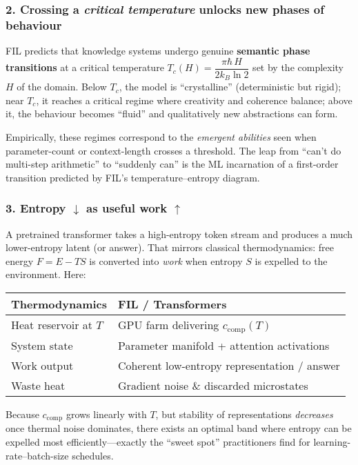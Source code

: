 \documentclass[11pt,letterpaper]{article}
\begin{document}
\subsubsection*{2. Crossing a \emph{critical temperature} unlocks new phases of behaviour}
FIL predicts that knowledge systems undergo genuine \textbf{semantic phase transitions} at a critical temperature $T_{c}(H) = \dfrac{\pi\hbar\,H}{2k_{B}\ln 2}$ set by the complexity $H$ of the domain. Below $T_{c}$, the model is “crystalline” (deterministic but rigid); near $T_{c}$, it reaches a critical regime where creativity and coherence balance; above it, the behaviour becomes “fluid” and qualitatively new abstractions can form.

Empirically, these regimes correspond to the \emph{emergent abilities} seen when parameter-count or context-length crosses a threshold. The leap from “can’t do multi-step arithmetic” to “suddenly can” is the ML incarnation of a first-order transition predicted by FIL’s temperature–entropy diagram.

\subsubsection*{3. Entropy $\downarrow$ as useful work $\uparrow$}
A pretrained transformer takes a high-entropy token stream and produces a much lower-entropy latent (or answer). That mirrors classical thermodynamics: free energy $F = E - TS$ is converted into \emph{work} when entropy $S$ is expelled to the environment. Here:
\begin{center}
\begin{tabular}{ll}
\toprule
\textbf{Thermodynamics} & \textbf{FIL / Transformers} \\
\midrule
Heat reservoir at $T$ & GPU farm delivering $c_{\text{comp}}(T)$ \\
System state & Parameter manifold + attention activations \\
Work output & Coherent low-entropy representation / answer \\
Waste heat & Gradient noise \& discarded microstates \\
\bottomrule
\end{tabular}
\end{center}
Because $c_{\text{comp}}$ grows linearly with $T$, but stability of representations \emph{decreases} once thermal noise dominates, there exists an optimal band where entropy can be expelled most efficiently—exactly the “sweet spot” practitioners find for learning-rate–batch-size schedules.
\end{document}
